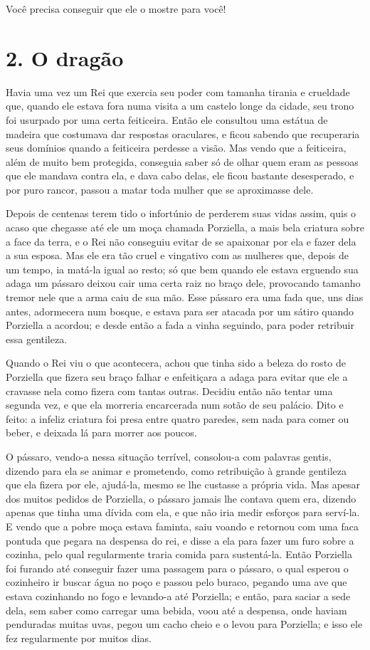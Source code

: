 Você precisa conseguir que ele o mostre para você!

\chapter{2. O dragão}

Havia uma vez um Rei que exercia seu poder com tamanha tirania e
crueldade que, quando ele estava fora numa visita a um castelo longe
da cidade, seu trono foi usurpado por uma certa feiticeira. Então ele
consultou uma estátua de madeira que costumava dar respostas
oraculares, e ficou sabendo que recuperaria seus domínios quando a
feiticeira perdesse a visão. Mas vendo que a feiticeira, além de
muito bem protegida, conseguia saber só de olhar quem eram as pessoas
que ele mandava contra ela, e dava cabo delas, ele ficou bastante
desesperado, e por puro rancor, passou a matar toda mulher que se
aproximasse dele.

Depois de centenas terem tido o infortúnio de perderem suas vidas
assim, quis o acaso que chegasse até ele um moça chamada Porziella, a
mais bela criatura sobre a face da terra, e o Rei não conseguiu
evitar de se apaixonar por ela e fazer dela a sua esposa. Mas ele era
tão cruel e vingativo com as mulheres que, depois de um tempo, ia
matá-la igual ao resto; só que bem quando ele estava erguendo sua
adaga um pássaro deixou cair uma certa raiz no braço dele, provocando
tamanho tremor nele que a arma caiu de sua mão. Esse pássaro era uma
fada que, uns dias antes, adormecera num bosque, e estava para ser
atacada por um sátiro quando Porziella a acordou; e desde então a
fada a vinha seguindo, para poder retribuir essa gentileza.

Quando o Rei viu o que acontecera, achou que tinha sido a beleza do
rosto de Porziella que fizera seu braço falhar e enfeitiçara a adaga
para evitar que ele a cravasse nela como fizera com tantas outras.
Decidiu então não tentar uma segunda vez, e que ela morreria
encarcerada num sotão de seu palácio. Dito e feito: a infeliz
criatura foi presa entre quatro paredes, sem nada para comer ou
beber, e deixada lá para morrer aos poucos. 

O pássaro, vendo-a nessa situação terrível, consolou-a com palavras
gentis, dizendo para ela se animar e prometendo, como retribuição à
grande gentileza que ela fizera por ele, ajudá-la, mesmo se lhe
custasse a própria vida. Mas apesar dos muitos pedidos de Porziella,
o pássaro jamais lhe contava quem era, dizendo apenas que tinha uma
dívida com ela, e que não iria medir esforços para serví-la. E vendo
que a pobre moça estava faminta, saiu voando e retornou com uma faca
pontuda que pegara na despensa do rei, e disse a ela para fazer um
furo sobre a cozinha, pelo qual regularmente traria comida para
sustentá-la. Então Porziella foi furando até conseguir fazer uma
passagem para o pássaro, o qual esperou o cozinheiro ir buscar água
no poço e passou pelo buraco, pegando uma ave que estava cozinhando
no fogo e levando-a até Porziella; e então, para saciar a sede dela,
sem saber como carregar uma bebida, voou até a despensa, onde haviam
penduradas muitas uvas, pegou um cacho cheio e o levou para
Porziella; e isso ele fez regularmente por muitos dias.

